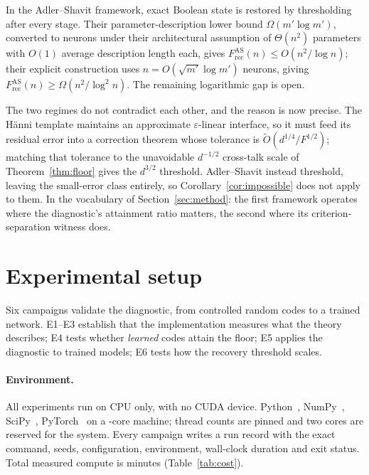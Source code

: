 \documentclass[preprint,12pt]{elsarticle}
\theoremstyle{definition}
\newcommand{\Otilde}{\widetilde{O}}
\newcommand{\FrecAS}{F_{\mathrm{rec}}^{\mathrm{AS}}}
\begin{document}
In the Adler--Shavit framework, exact Boolean state is restored by thresholding after every
stage. Their parameter-description lower bound $\Omega(m'\log m')$, converted to neurons under
their architectural assumption of $\Theta(n^2)$ parameters with $O(1)$ average description
length each, gives $\FrecAS(n)\le O(n^2/\log n)$; their explicit construction uses
$n=O(\sqrt{m'}\log m')$ neurons, giving $\FrecAS(n)\ge\Omega(n^2/\log^2 n)$. The remaining
logarithmic gap is open.

The two regimes do not contradict each other, and the reason is now precise. The H\"{a}nni
template maintains an approximate $\varepsilon$-linear interface, so it must feed its residual
error into a correction theorem whose tolerance is $\Otilde(d^{1/4}/F^{1/2})$; matching that
tolerance to the unavoidable $d^{-1/2}$ cross-talk scale of Theorem~\ref{thm:floor} gives the
$d^{3/2}$ threshold. Adler--Shavit instead threshold, leaving the small-error class entirely,
so Corollary~\ref{cor:impossible} does not apply to them. In the vocabulary of
Section~\ref{sec:method}: the first framework operates where the diagnostic's attainment ratio
matters, the second where its criterion-separation witness does.

\section{Experimental setup}
\label{sec:setup}

Six campaigns validate the diagnostic, from controlled random codes to a trained network.
E1--E3 establish that the implementation measures what the theory describes; E4 tests whether
\emph{learned} codes attain the floor; E5 applies the diagnostic to trained models; E6 tests
how the recovery threshold scales.

\paragraph{Environment.} All experiments run on CPU only, with no CUDA device.
Python~\EnvPython, NumPy~\EnvNumpy, SciPy~\EnvScipy, PyTorch~\EnvTorch{} on a
\EnvCpuCount-core machine; thread counts are pinned and two cores are reserved for the system.
Every campaign writes a run record with the exact command, seeds, configuration, environment,
wall-clock duration and exit status. Total measured compute is \DurTotalMin{} minutes
(Table~\ref{tab:cost}).
\end{document}

